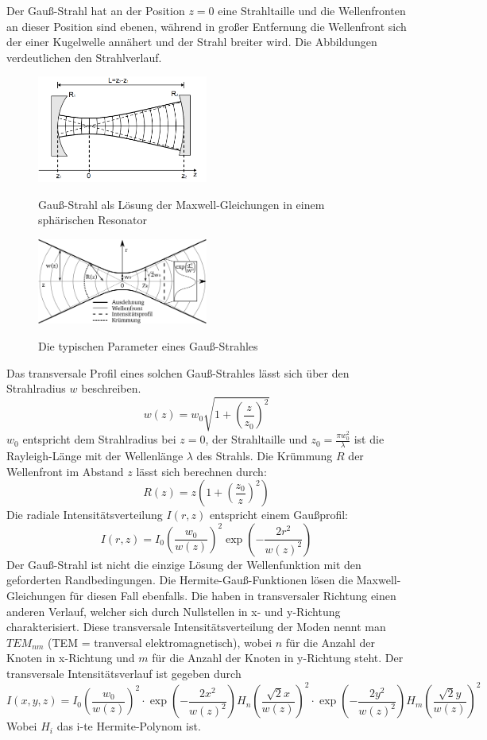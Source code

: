 \documentclass[bigchapter,colorback,accentcolor=tud4b,linedtoc,11pt]{tudreport}
\numberwithin{equation}{subsection}
\begin{document}
Der Gauß-Strahl hat an der Position \(z=0\) eine Strahltaille und die Wellenfronten an dieser Position sind ebenen, während in großer Entfernung die Wellenfront sich der einer Kugelwelle annähert und der Strahl breiter wird. Die Abbildungen verdeutlichen den Strahlverlauf.

\begin{figure}[h]
	\centering
		\includegraphics[width=0.5\textwidth]{img/gauss_res.png}
	\caption{Gauß-Strahl als Lösung der Maxwell-Gleichungen in einem sphärischen Resonator}
  \cite{Resonatortheorie}
\end{figure}
\begin{figure}[h]
	\centering
		\includegraphics[width=0.5\textwidth]{img/gauss_param.png}
	\caption{Die typischen Parameter eines Gauß-Strahles}
  \cite{GSParamater}
\end{figure}
\FloatBarrier

Das transversale Profil eines solchen Gauß-Strahles lässt sich über den Strahlradius $w$ beschreiben.
$$w(z) = w_0 \sqrt{1+\left(\frac{z}{z_0}\right)^2}$$
$w_0$ entspricht dem Strahlradius bei $z=0$, der Strahltaille und $z_0 = \frac{\pi w_0^2}{\lambda}$ ist die Rayleigh-Länge mit der Wellenlänge $\lambda$ des Strahls.
Die Krümmung $R$ der Wellenfront im Abstand $z$ lässt sich berechnen durch:
$$R(z) = z \left(1+\left(\frac{z_0}{z}\right)^2\right)$$
Die radiale Intensitätsverteilung $I(r,z)$ entspricht einem Gaußprofil:
$$ I(r,z) = I_0 \left(\frac{w_0}{w(z)}\right)^2 \exp\left(-\frac{2r^2}{w(z)^2}\right)  $$
Der Gauß-Strahl ist nicht die einzige Lösung der Wellenfunktion mit den geforderten Randbedingungen. Die Hermite-Gauß-Funktionen lösen die Maxwell-Gleichungen für diesen Fall ebenfalls. Die haben in transversaler Richtung einen anderen Verlauf, welcher sich durch Nullstellen in x- und y-Richtung charakterisiert. Diese transversale Intensitätsverteilung der Moden nennt man $TEM_{nm}$ (TEM = tranversal elektromagnetisch), wobei $n$ für die Anzahl der Knoten in x-Richtung und $m$ für die Anzahl der Knoten in y-Richtung steht.
Der transversale Intensitätsverlauf ist gegeben durch
$$I(x,y, z) = I_0 \left(\frac{w_0}{w(z)}\right)^2 \cdot \exp\left(-\frac{2 x^2}{w(z)^2}\right) H_n\left(\frac{\sqrt{2}x}{w(z)}\right)^2 \cdot \exp\left(-\frac{2 y^2}{w(z)^2}\right) H_m\left(\frac{\sqrt{2}y}{w(z)}\right)^2$$\cite{TransModeIntensity2}
Wobei $H_i$ das i-te Hermite-Polynom ist.
\end{document}
